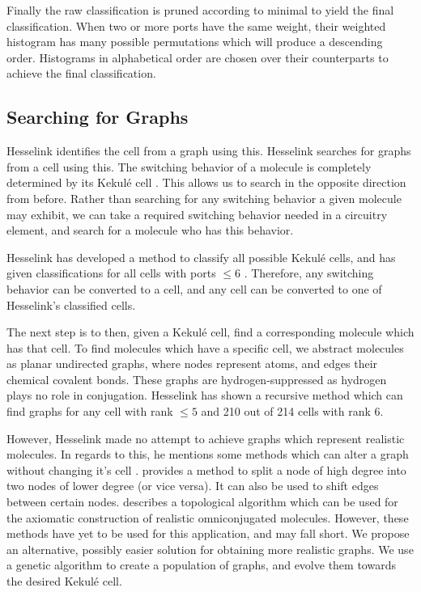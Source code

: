 \documentclass[12pt]{article}
\begin{document}
Finally the raw classification is pruned according to minimal to yield the final classification. When two or more ports have the same weight, their weighted histogram has many possible permutations which will produce a descending order. Histograms in alphabetical order are chosen over their counterparts to achieve the final classification. 

\subsection{Searching for Graphs}


Hesselink identifies the cell from a graph using this.
Hesselink searches for graphs from a cell using this.
The switching behavior of a molecule is completely determined by its Kekul\'e cell \cite{H13, HH13}. This allows us to search in the opposite direction from before. Rather than searching for any switching behavior a given molecule may exhibit, we can take a required switching behavior needed in a circuitry element, and search for a molecule who has this behavior.

Hesselink \cite{H13} has developed a method to classify all possible Kekul\'e cells, and has given classifications for all cells with ports $\le 6$ . Therefore, any switching behavior can be converted to a cell, and any cell can be converted to one of Hesselink's \cite{H13} classified cells.

The next step is to then, given a Kekul\'e cell, find a corresponding molecule which has that cell. To find molecules which have a specific cell, we abstract molecules as planar undirected graphs, where nodes represent atoms, and edges their chemical covalent bonds. These graphs are hydrogen-suppressed as hydrogen plays no role in conjugation. Hesselink \cite{H13} has shown a recursive method which can find graphs for any cell with rank $\le 5$ and 210 out of 214 cells with rank 6. 

However, Hesselink made no attempt to achieve graphs which represent realistic molecules. In regards to this, he mentions some methods which can alter a graph without changing it's cell \cite{HH13, v06}. \cite{HH13} provides a method to split a node of high degree into two nodes of lower degree (or vice versa). It can also be used to shift edges between certain nodes. \cite{v06} describes a topological algorithm which can be used for the axiomatic construction of realistic omniconjugated molecules. However, these methods have yet to be used for this application, and may fall short. We propose an alternative, possibly easier solution for obtaining more realistic graphs. We use a genetic algorithm to create a population of graphs, and evolve them towards the desired Kekul\'e cell.
\end{document}
